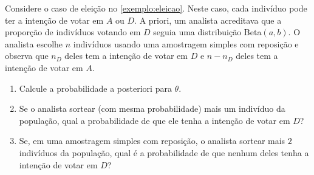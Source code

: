 \begin{exercise}
 \label{exercise:predictive_1}
 Considere o caso de eleição no \cref{exemplo:eleicao}.
 Neste caso, cada indivíduo pode ter a
 intenção de votar em $A$ ou $D$.
 A priori, um analista acreditava que 
 a proporção de indivíduos votando em $D$
 seguia uma distribuição Beta$(a,b)$.
 O analista escolhe $n$ indivíduos usando uma 
 amostragem simples com reposição e
 observa que $n_{D}$ deles tem 
 a intenção de votar em $D$ e
 $n-n_{D}$ deles tem a intenção de votar em $A$.
 \begin{enumerate}[label=(\alph*)]
  \item Calcule a probabilidade a posteriori para $\theta$.
  \item Se o analista sortear (com mesma probabilidade)
  mais um indivíduo da população, qual a
  probabilidade de que ele tenha a 
  intenção de votar em $D$?
  \item Se, em uma amostragem simples com reposição, o 
  analista sortear mais $2$ indivíduos da população, qual é 
  a probabilidade de que nenhum deles tenha
  a intenção de votar em $D$?
 \end{enumerate}
\end{exercise}

